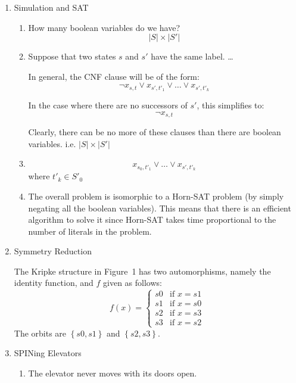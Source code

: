 \documentclass{article}
\begin{document}
\begin{enumerate}
  Prove that the set of states satisfying $AF p$ is the least fixpoint of the function $\tau$ given by $\tau(Z) = p \vee AX Z$.

\begin{proof}
  Claim 1:  $AF p$ is a fixpoint of $\tau$.

  \[\tau(AF p) = p \vee AX(AF p) = p \vee X(AF p) = AF p \]
  Thus $AF p$ is a fixpoint of $\tau$.

  Claim 2: For any fixpoint of $\tau$ $S$, $AF p \supseteq S$.

  Assume to the contrary that this were not the case.  This would mean that
  there exists some computation $Z \in S$ such that $Z \not\in AF p$.
  This would mean that there exists a path for which $p$ is not true,
  or $EG \neg p$.  Now if we take $\tau(Z)$, we get $p \vee AX(EG \neg p)$,
  which is clearly not equivalent.  Thus $S$ is not a fixed-point of $\tau$.
  This contradicts our assumption.
\end{proof}

\item Simulation and SAT
  \begin{enumerate}
    \item How many boolean variables do we have?
      \[ |S| \times |S'| \]
    \item Suppose that two states $s$ and $s'$ have the same label. \dots

      In general, the CNF clause will be of the form:
      \[ \neg x_{s,t} \vee x_{s',t'_1} \vee \dots \vee x_{s',t'_k} \]

      In the case where there are no successors of $s'$, this simplifies to:
      \[ \neg x_{s,t} \]

      Clearly, there can be no more of these clauses than there are boolean
      variables. i.e. $|S| \times |S'|$
    \item
      \[ x_{s_0,t'_1} \vee \dots \vee x_{s',t'_k} \]
      where $t'_k \in S'_0$
    \item The overall problem is isomorphic to a Horn-SAT problem
      (by simply negating all the boolean variables).  This means that there
      is an efficient algorithm to solve it since Horn-SAT takes time
      proportional to the number of literals in the problem.
  \end{enumerate}
\item Symmetry Reduction

  The Kripke structure in Figure~1 has two automorphisms, namely the identity
  function, and $f$ given as follows:
  \[
  f(x) = \begin{cases}
    s0 &\text{if } x = s1 \\
    s1 &\text{if } x = s0 \\
    s2 &\text{if } x = s3 \\
    s3 &\text{if } x = s2
  \end{cases}
  \]
  The orbits are $\left\{ s0, s1 \right\}$ and $\left\{ s2, s3 \right\}$.
\item SPINing Elevators
  \begin{enumerate}
    \item The elevator never moves with its doors open.


\end{enumerate}
\end{enumerate}
\end{document}
